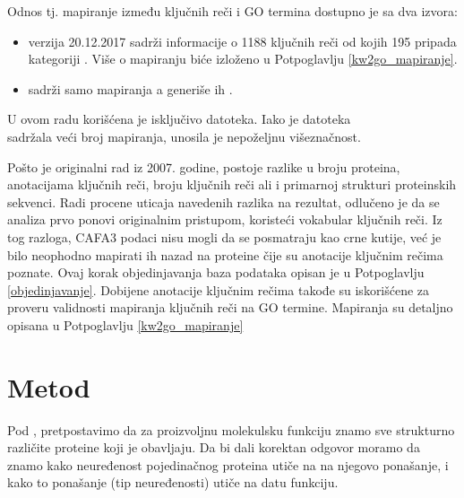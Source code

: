 Odnos tj. mapiranje između ključnih reči i GO termina dostupno je sa dva izvora:
\begin{itemize}
  \item {}\cite{keywlist_txt} verzija 20.12.2017 sadrži
    informacije o 1188 ključnih reči od kojih 195 pripada kategoriji
    . Više o mapiranju biće
    izloženo u Potpoglavlju \ref{kw2go_mapiranje}.
  \item {}\cite{uniprotkb_kw2go} sadrži samo mapiranja a
    generiše ih  \parencite{Barrell2009}. 
\end{itemize}

U ovom radu korišćena je isključivo  datoteka. Iako je
datoteka \\  sadržala veći broj mapiranja, unosila je
nepoželjnu višeznačnost.

Pošto je originalni rad iz 2007. godine, postoje razlike u broju proteina,
anotacijama ključnih reči, broju ključnih reči ali i primarnoj strukturi proteinskih
sekvenci.  Radi procene uticaja navedenih razlika na rezultat, odlučeno je da se
analiza prvo ponovi originalnim pristupom, koristeći vokabular ključnih reči.
Iz tog razloga, CAFA3 podaci nisu mogli da se posmatraju kao crne kutije, već
je bilo neophodno mapirati ih nazad na \swissprot proteine čije su anotacije 
ključnim rečima poznate. Ovaj korak objedinjavanja baza podataka opisan je u
Potpoglavlju \ref{objedinjavanje}. Dobijene anotacije ključnim rečima takođe su
iskorišćene za proveru validnosti mapiranja ključnih reči na GO termine.
Mapiranja su detaljno opisana u Potpoglavlju \ref{kw2go_mapiranje}



\section {Metod}


Pod ,
pretpostavimo da za proizvoljnu molekulsku funkciju znamo sve strukturno različite
proteine koji je obavljaju.  Da bi dali korektan odgovor  moramo da znamo kako
neuređenost pojedinačnog proteina utiče na
na njegovo ponašanje, i kako to ponašanje (tip neuređenosti) utiče na datu funkciju.

